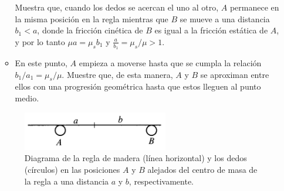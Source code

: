 \documentclass[letterpaper]{article}
\begin{document}
\begin{enumerate}[label=\textbf{1.\arabic*)}]
\begin{itemize}[label = \textbullet]
		Muestra que, cuando los dedos se acercan el uno al otro, \(A\) permanece en la misma posición en la regla mientras que \(B\) se mueve a una distancia \(b_{1}<a\), donde la fricción cinética de \(B\) es igual a la fricción estática de \(A\), y por lo tanto \(\mu a=\mu_{s} b_{1}\) y \(\frac{a}{b_{1}}=\mu_{s}/\mu>1\).
		\item En este punto, \(A\) empieza a moverse hasta que se cumpla la relación \(b_{1}/{a_{1}}={\mu_{s}}/{\mu}\).	Muestre que, de esta manera, \(A\) y \(B\) se aproximan entre ellos con una progresión geométrica hasta que estos lleguen al punto medio. 
	\end{itemize}
    \begin{figure}[htb]
        \centering
        \includegraphics[width=0.6\textwidth]{imagen3.png}
        \caption{\footnotesize Diagrama de la regla de madera (línea horizontal) y los dedos (círculos) en las posiciones \(A\) y \(B\) alejados del centro de masa de la regla a una distancia \(a\) y \(b\), respectivamente.}
        \label{fig:regla}
    \end{figure}
\end{enumerate}
\end{document}
